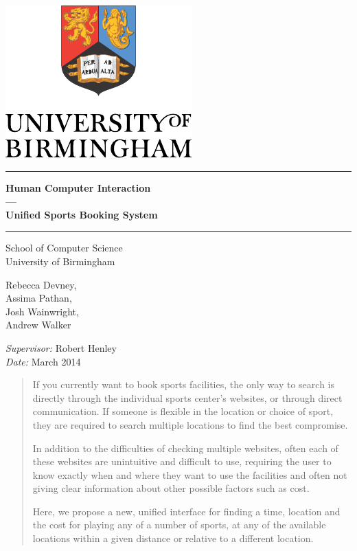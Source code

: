 \begin{titlepage}
	\begin{center}
	\vspace*{\fill}

	\centering
	\includegraphics[scale=1.0]{Logo.pdf}
	\vfill

	\hrule
	{\LARGE\bf Human Computer Interaction \\
		--- \\
		Unified Sports Booking System\\[0.4cm]}
	\hrule

	\vfill
	\large
	School of Computer Science\\
	University of Birmingham

	\vfill{%
		Rebecca Devney,\\
		Assima Pathan,\\
		Josh Wainwright,\\
		Andrew Walker}
	\vfill

	\vfill
	\textit{Supervisor:} Robert Henley \\
	\vfill
	\textit{Date:} March 2014
	\vfill
	\vfill

	\begin{abstract}
		If you currently want to book sports facilities, the only way to search
		is directly through the individual sports center's websites, or through
		direct communication. If someone is flexible in the location or choice
		of sport, they are required to search multiple locations to find the
		best compromise.

		In addition to the difficulties of checking multiple websites, often
		each of these websites are unintuitive and difficult to use, requiring
		the user to know exactly when and where they want to use the facilities
		and often not giving clear information about other possible factors
		such as cost.

		Here, we propose a new, unified interface for finding a time, location
		and the cost for playing any of a number of sports, at any of the
		available locations within a given distance or relative to a different
		location.
	\end{abstract}

	\end{center}
\end{titlepage}


